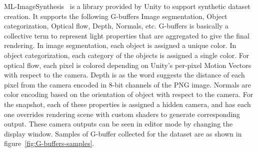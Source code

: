 ML-ImageSynthesis~\cite{imagesynthesis} is a library provided by Unity to support synthetic dataset creation.
It supports the following G-buffers Image segmentation, Object categorization, Optical flow, Depth, Normals, etc.
G-buffers is basically a collective term to represent light properties that are aggregated to give the final rendering.
In image segmentation, each object is assigned a unique color.
In object categorization, each category of the objects is assigned a single color.
For optical flow, each pixel is colored depending on Unity's per-pixel Motion Vectors with respect to the camera.
Depth is as the word suggests the distance of each pixel from the camera encoded in 8-bit channels of the PNG image.
Normals are color encoding based on the orientation of object with respect to the camera.
For the snapshot, each of these properties is assigned a hidden camera, and has each one overrides rendering scene with custom shaders to generate corresponding output.
These camera outputs can be seen in editor mode by changing the display window.
Samples of G-buffer collected for the dataset are as shown in figure~\ref{fig:G-buffers-samples}.

